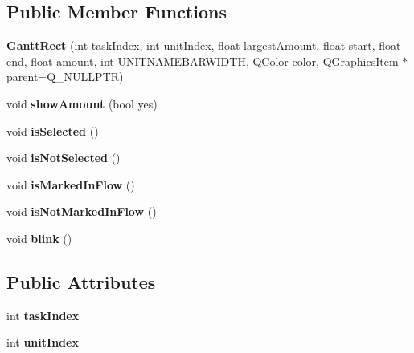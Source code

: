 \subsection*{Public Member Functions}
\begin{DoxyCompactItemize}
\item 
\hypertarget{class_gantt_rect_a6d4ff676e98da21ad460dc273b237356}{}{\bfseries Gantt\+Rect} (int task\+Index, int unit\+Index, float largest\+Amount, float start, float end, float amount, int U\+N\+I\+T\+N\+A\+M\+E\+B\+A\+R\+W\+I\+D\+T\+H, Q\+Color color, Q\+Graphics\+Item $\ast$parent=Q\+\_\+\+N\+U\+L\+L\+P\+T\+R)\label{class_gantt_rect_a6d4ff676e98da21ad460dc273b237356}

\item 
\hypertarget{class_gantt_rect_ab56a963d676eaa923430bb940390e017}{}void {\bfseries show\+Amount} (bool yes)\label{class_gantt_rect_ab56a963d676eaa923430bb940390e017}

\item 
\hypertarget{class_gantt_rect_aebb14eb8a807a0e5d560c311c81961c3}{}void {\bfseries is\+Selected} ()\label{class_gantt_rect_aebb14eb8a807a0e5d560c311c81961c3}

\item 
\hypertarget{class_gantt_rect_a1681372c908aaab78c22beaf4146a432}{}void {\bfseries is\+Not\+Selected} ()\label{class_gantt_rect_a1681372c908aaab78c22beaf4146a432}

\item 
\hypertarget{class_gantt_rect_a3d470a764ab8a79c08502d8c92859f88}{}void {\bfseries is\+Marked\+In\+Flow} ()\label{class_gantt_rect_a3d470a764ab8a79c08502d8c92859f88}

\item 
\hypertarget{class_gantt_rect_a769aacba6fa021fe98b8b53f29873851}{}void {\bfseries is\+Not\+Marked\+In\+Flow} ()\label{class_gantt_rect_a769aacba6fa021fe98b8b53f29873851}

\item 
\hypertarget{class_gantt_rect_ac4190e95053e095f83874ba41b0e18a2}{}void {\bfseries blink} ()\label{class_gantt_rect_ac4190e95053e095f83874ba41b0e18a2}

\end{DoxyCompactItemize}
\subsection*{Public Attributes}
\begin{DoxyCompactItemize}
\item 
\hypertarget{class_gantt_rect_a6642ac413af5ade187fac723016f8292}{}int {\bfseries task\+Index}\label{class_gantt_rect_a6642ac413af5ade187fac723016f8292}

\item 
\hypertarget{class_gantt_rect_aad3beda6dc33e7144632705476e2745a}{}int {\bfseries unit\+Index}\label{class_gantt_rect_aad3beda6dc33e7144632705476e2745a}

\end{DoxyCompactItemize}
